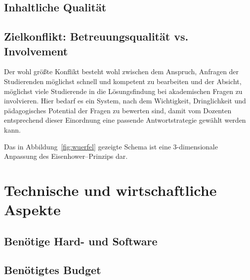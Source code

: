 \subsection{Inhaltliche Qualität} %
\label{sub:inhaltliche_qualitat}


\subsection{Zielkonflikt: Betreuungsqualität vs. Involvement} %
\label{sub:zielkonflikt_betreuungsqualitat_vs_involvement}
Der wohl größte Konflikt besteht wohl zwischen dem Anspruch, Anfragen der Studierenden möglichst schnell und kompetent zu bearbeiten und der Absicht, möglichst viele Studierende in die Lösungsfindung bei akademischen Fragen zu involvieren. Hier bedarf es ein System, nach dem Wichtigkeit, Dringlichkeit und pädagogisches Potential der Fragen zu bewerten sind, damit vom Dozenten entsprechend dieser Einordnung eine passende Antwortstrategie gewählt werden kann. 

Das in Abbildung~\ref{fig:wuerfel} gezeigte Schema ist eine 3-dimensionale Anpassung des Eisenhower–Prinzips dar.





\section{Technische und wirtschaftliche Aspekte} %
\label{sec:technische_und_wirtschaftliche_aspekte}

\subsection{Benötige Hard- und Software} %
\label{sub:benotige_hard_und_software}


\subsection{Benötigtes Budget} %
\label{sub:benotigtes_budget}



